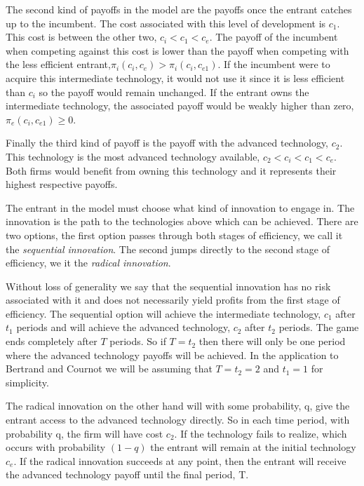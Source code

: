 \documentclass[11pt]{article}
\begin{document}
The second kind of payoffs in the model are the payoffs once the entrant catches up to the incumbent. The cost associated with this level of development is $c_{1}$. This cost is between the other two, $c_i<c_{1}<c_e$. The payoff of the incumbent when competing against this cost is lower than the payoff when competing with the less efficient entrant,$ \pi_i( c_i,c_{e}) > \pi_i( c_i, c_{e1} )$. If the incumbent were to acquire this intermediate technology, it would not use it since it is less efficient than $c_i$ so the payoff would remain unchanged. If the entrant owns the intermediate technology, the associated payoff would be weakly higher than zero, $\pi_e(c_i,c_{e1}) \geq 0$.

Finally the third kind of payoff is the payoff with the advanced technology, $c_2$. This technology is the most advanced technology available, $c_2<c_i<c_1<c_e$. Both firms would benefit from owning this technology and it represents their highest respective payoffs. 

The entrant in the model must choose what kind of innovation to engage in. The innovation is the path to the technologies above which can be achieved. There are two options, the first option passes through both stages of efficiency, we call it the \textit{sequential innovation}. The second jumps directly to the second stage of efficiency, we it the \textit{radical innovation}.  

Without loss of generality we say that the sequential innovation has no risk associated with it and does not necessarily yield profits from the first stage of efficiency. The sequential option will achieve the intermediate technology, $c_1$ after $t_1$ periods and will achieve the advanced technology, $c_2$ after $t_2$ periods. The game ends completely after $T$ periods. So if $T=t_2$ then there will only be one period where the advanced technology payoffs will be achieved. In the application to Bertrand and Cournot we will be assuming that $T=t_2=2$ and $t_1=1$ for simplicity. 


The radical innovation on the other hand will with some probability, q, give the entrant access to the advanced technology directly. So in each time period, with probability q, the firm will have cost $c_2$. If the technology fails to realize, which occurs with probability $(1-q)$ the entrant will remain at the initial technology $c_e$. If the radical innovation succeeds at any point, then the entrant will receive the advanced technology payoff until the final period, T. 
\end{document}
